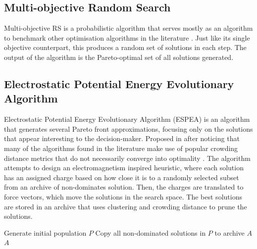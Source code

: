 \subsection{Multi-objective Random Search}

Multi-objective RS is a probabilistic algorithm that serves mostly as an algorithm to benchmark other optimisation algorithms in the literature \cite{zitzler1998multiobjective}. Just like its single objective counterpart, this produces a random set of solutions in each step. The output of the algorithm is the Pareto-optimal set of all solutions generated.

\subsection{Electrostatic Potential Energy Evolutionary Algorithm}

Electrostatic Potential Energy Evolutionary Algorithm (ESPEA) \cite{teich2001pareto} is an algorithm that generates several Pareto front approximations, focusing only on the solutions that appear interesting to the decision-maker. Proposed in \cite{teich2001pareto} after noticing that many of the algorithms found in the literature make use of popular crowding distance metrics that do not necessarily converge into optimality \cite{deb2002fast}. %
%
The algorithm attempts to design an electromagnetism inspired heuristic, where each solution has an assigned charge based on how close it is to a randomly selected subset from an archive of non-dominates solution. Then, the charges are translated to force vectors, which move the solutions in the search space. The best solutions are stored in an archive that uses clustering and crowding distance to prune the solutions.\\

\begin{algorithm}[H]
\label{espea_alg}
\caption{ESPEA}
\SetAlgoLined
    Generate initial population $P$\;
    Copy all non-dominated solutions in $P$ to archive $A$\;
    \Return $A$\;
\end{algorithm}

